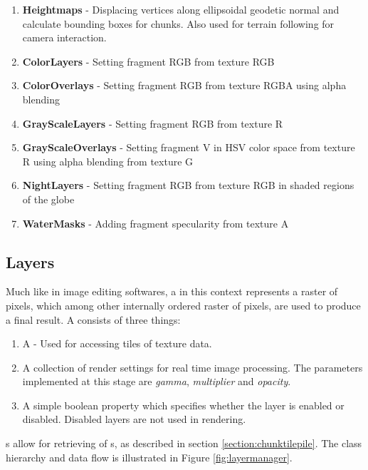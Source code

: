 \begin{enumerate}
\item \textbf{Heightmaps} - Displacing vertices along ellipsoidal geodetic normal and calculate bounding boxes for chunks. Also used for terrain following for camera interaction.
\item \textbf{ColorLayers} - Setting fragment RGB from texture RGB
\item \textbf{ColorOverlays} - Setting fragment RGB from texture RGBA using alpha blending
\item \textbf{GrayScaleLayers} - Setting fragment RGB from texture R
\item \textbf{GrayScaleOverlays} - Setting fragment V in HSV color space from texture R using alpha blending from texture G
\item \textbf{NightLayers} - Setting fragment RGB from texture RGB in shaded regions of the globe
\item \textbf{WaterMasks} - Adding fragment specularity from texture A
\end{enumerate}

\subsection{Layers}
Much like in image editing softwares, a  in this context represents a raster of pixels, which among other internally ordered raster of pixels, are used to produce a final result. A  consists of three things:

\begin{enumerate}
\item A  - Used for accessing tiles of texture data.
\item A collection of render settings for real time image processing. The parameters implemented at this stage are \emph{gamma}, \emph{multiplier} and \emph{opacity}.
\item A simple boolean property which specifies whether the layer is enabled or disabled. Disabled layers are not used in rendering.
\end{enumerate}

s allow for retrieving of s, as described in section \ref{section:chunktilepile}. The class hierarchy and data flow is illustrated in Figure \ref{fig:layermanager}.

